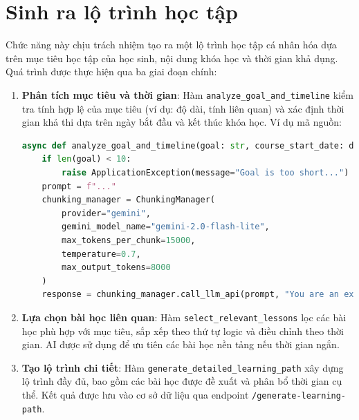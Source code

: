    
    


\section{Sinh ra lộ trình học tập}
Chức năng này chịu trách nhiệm tạo ra một lộ trình học tập cá nhân hóa dựa trên mục tiêu học tập của học sinh, nội dung khóa học và thời gian khả dụng. Quá trình được thực hiện qua ba giai đoạn chính:

\begin{enumerate}
    \item \textbf{Phân tích mục tiêu và thời gian}: Hàm \texttt{analyze\_goal\_and\_timeline} kiểm tra tính hợp lệ của mục tiêu (ví dụ: độ dài, tính liên quan) và xác định thời gian khả thi dựa trên ngày bắt đầu và kết thúc khóa học. Ví dụ mã nguồn:
    \begin{lstlisting}[language=Python]
async def analyze_goal_and_timeline(goal: str, course_start_date: datetime, ...):
    if len(goal) < 10:
        raise ApplicationException(message="Goal is too short...")
    prompt = f"..."
    chunking_manager = ChunkingManager(
        provider="gemini",
        gemini_model_name="gemini-2.0-flash-lite",
        max_tokens_per_chunk=15000,
        temperature=0.7,
        max_output_tokens=8000
    )
    response = chunking_manager.call_llm_api(prompt, "You are an expert in goal validation and timeline analysis.")
    \end{lstlisting}

    \item \textbf{Lựa chọn bài học liên quan}: Hàm \texttt{select\_relevant\_lessons} lọc các bài học phù hợp với mục tiêu, sắp xếp theo thứ tự logic và điều chỉnh theo thời gian. AI được sử dụng để ưu tiên các bài học nền tảng nếu thời gian ngắn.

    \item \textbf{Tạo lộ trình chi tiết}: Hàm \texttt{generate\_detailed\_learning\_path} xây dựng lộ trình đầy đủ, bao gồm các bài học được đề xuất và phân bổ thời gian cụ thể. Kết quả được lưu vào cơ sở dữ liệu qua endpoint \texttt{/generate-learning-path}.
\end{enumerate}

